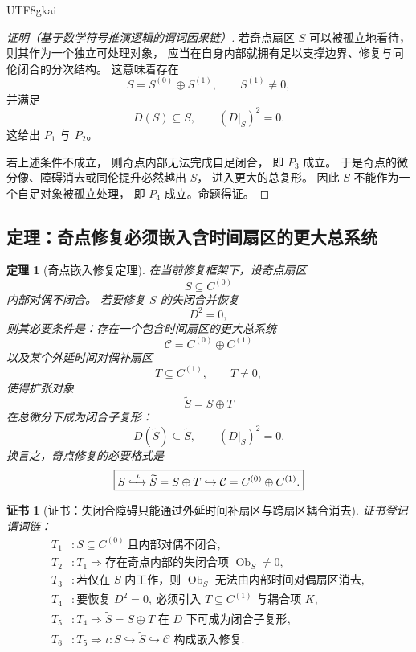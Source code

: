 \documentclass[12pt]{article}
\newtheorem{theorem}{定理}[section]
\newtheorem{Certificate}{证书}[section]
\newcommand{\Ob}{\operatorname{Ob}}
\begin{document}
\begin{CJK*}{UTF8}{gkai}
\begin{proof}[证明（基于数学符号推演逻辑的谓词因果链）]
若奇点扇区 $S$ 可以被孤立地看待，
则其作为一个独立可处理对象，
应当在自身内部就拥有足以支撑边界、修复与同伦闭合的分次结构。
这意味着存在
\[
  S=S^{(0)}\oplus S^{(1)},
  \qquad
  S^{(1)}\neq 0,
\]
并满足
\[
  D(S)\subseteq S,
  \qquad
  (D|_S)^2=0.
\]
这给出 $P_1$ 与 $P_2$。

若上述条件不成立，
则奇点内部无法完成自足闭合，
即 $P_3$ 成立。
于是奇点的微分像、障碍消去或同伦提升必然越出 $S$，
进入更大的总复形。
因此 $S$ 不能作为一个自足对象被孤立处理，
即 $P_4$ 成立。命题得证。
\end{proof}

\subsection{定理：奇点修复必须嵌入含时间扇区的更大总系统}
\label{subsec:tex43-ch7-theorem}

\begin{theorem}[奇点嵌入修复定理]
\label{thm:tex43-singular-embedding-repair}
在当前修复框架下，设奇点扇区
\[
  S\subseteq C^{(0)}
\]
内部对偶不闭合。
若要修复 $S$ 的失闭合并恢复
\[
  D^2=0,
\]
则其必要条件是：存在一个包含时间扇区的更大总系统
\[
  \mathcal C=C^{(0)}\oplus C^{(1)}
\]
以及某个外延时间对偶补扇区
\[
  T\subseteq C^{(1)},
  \qquad
  T\neq 0,
\]
使得扩张对象
\[
  \widetilde{S}=S\oplus T
\]
在总微分下成为闭合子复形：
\[
  D(\widetilde{S})\subseteq \widetilde{S},
  \qquad
  (D|_{\widetilde{S}})^2=0.
\]
换言之，奇点修复的必要格式是
\[
  \boxed{
    S
    \xhookrightarrow{\ \iota\ }
    \widetilde{S}=S\oplus T
    \hookrightarrow
    \mathcal C=C^{(0)}\oplus C^{(1)}.
  }
\]
\end{theorem}

\begin{Certificate}[证书：失闭合障碍只能通过外延时间补扇区与跨扇区耦合消去]
\label{cert:tex43-singular-embedding-repair}
证书登记谓词链：
\[
\begin{aligned}
  T_1 &: S\subseteq C^{(0)}\ \text{且内部对偶不闭合},\\
  T_2 &: T_1 \Rightarrow \text{存在奇点内部的失闭合项 }\Ob_S\neq 0,\\
  T_3 &: \text{若仅在 }S\text{ 内工作，则 }\Ob_S\text{ 无法由内部时间对偶扇区消去},\\
  T_4 &: \text{要恢复 }D^2=0,\ \text{必须引入 }T\subseteq C^{(1)}\text{ 与耦合项 }K,\\
  T_5 &: T_4 \Rightarrow
         \widetilde{S}=S\oplus T\text{ 在 }D\text{ 下可成为闭合子复形},\\
  T_6 &: T_5 \Rightarrow \iota:S\hookrightarrow \widetilde{S}\hookrightarrow \mathcal C
         \text{ 构成嵌入修复}.
\end{aligned}
\]
\end{Certificate}


\end{CJK*}
\end{document}
